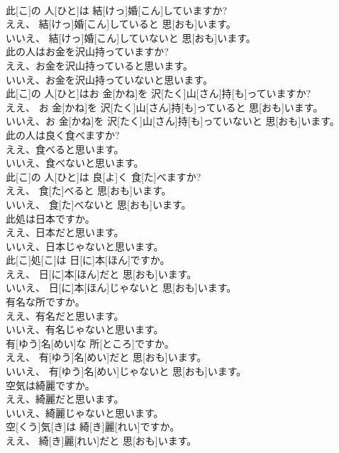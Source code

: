 \documentclass[8pt]{extreport}
\begin{document}
\begin{CJK}{UTF8}{min}
\\	此[こ]の 人[ひと]は 結[けっ]婚[こん]していますか? 
\\	ええ、 結[けっ]婚[こん]していると 思[おも]います。 
\\	いいえ、 結[けっ]婚[こん]していないと 思[おも]います。
\\	此の人はお金を沢山持っていますか? 
\\	ええ、お金を沢山持っていると思います。 
\\	いいえ、お金を沢山持っていないと思います。	
\\	此[こ]の 人[ひと]はお 金[かね]を 沢[たく]山[さん]持[も]っていますか? 
\\	ええ、 お 金[かね]を 沢[たく]山[さん]持[も]っていると 思[おも]います。 
\\	いいえ、お 金[かね]を 沢[たく]山[さん]持[も]っていないと 思[おも]います。
\\	此の人は良く食べますか? 
\\	ええ、食べると思います。 
\\	いいえ、食べないと思います。	
\\	此[こ]の 人[ひと]は 良[よ]く 食[た]べますか? 
\\	ええ、 食[た]べると 思[おも]います。 
\\	いいえ、 食[た]べないと 思[おも]います。
\\	此処は日本ですか。 
\\	ええ、日本だと思います。 
\\	いいえ、日本じゃないと思います。	
\\	此[こ]処[こ]は 日[に]本[ほん]ですか。 
\\	ええ、 日[に]本[ほん]だと 思[おも]います。 
\\	いいえ、 日[に]本[ほん]じゃないと 思[おも]います。
\\	有名な所ですか。 
\\	ええ、有名だと思います。 
\\	いいえ、有名じゃないと思います。	
\\	有[ゆう]名[めい]な 所[ところ]ですか。 
\\	ええ、 有[ゆう]名[めい]だと 思[おも]います。 
\\	いいえ、 有[ゆう]名[めい]じゃないと 思[おも]います。
\\	空気は綺麗ですか。 
\\	ええ、綺麗だと思います。 
\\	いいえ、綺麗じゃないと思います。	
\\	空[くう]気[き]は 綺[き]麗[れい]ですか。 
\\	ええ、 綺[き]麗[れい]だと 思[おも]います。 

\end{CJK}
\end{document}
